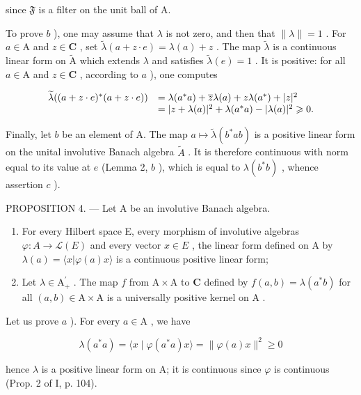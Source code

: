 since \(\mathfrak{F}\) is a filter on the unit ball of A.

To prove \(b\) ), one may assume that \(\lambda\) is not zero, and then that \(\| \lambda \| = 1\) . For \(a \in \mathrm{A}\) and \(z \in \mathbf{C}\) , set \(\widetilde{\lambda}(a + z \cdot e) = \lambda(a) + z\) . The map \(\widetilde{\lambda}\) is a continuous linear form on \(\widetilde{\mathrm{A}}\) which extends \(\lambda\) and satisfies \(\widetilde{\lambda}(e) = 1\) . It is positive: for all \(a \in \mathrm{A}\) and \(z \in \mathbf{C}\) , according to \(a\) ), one computes

\[
\begin{array}{r l} \widetilde {\lambda} ((a + z \cdot e) ^ {*} (a + z \cdot e)) & = \lambda (a ^ {*} a) + \overline {{z}} \lambda (a) + z \lambda (a ^ {*}) + | z | ^ {2} \\ & = | z + \lambda (a) | ^ {2} + \lambda (a ^ {*} a) - | \lambda (a) | ^ {2} \geqslant 0. \end{array}
\]

Finally, let \(b\) be an element of A. The map \(a \mapsto \widetilde{\lambda}(b^{*}ab)\) is a positive linear form on the unital involutive Banach algebra \(\widetilde{A}\) . It is therefore continuous with norm equal to its value at \(e\) (Lemma 2, \(b\) ), which is equal to \(\lambda(b^{*}b)\) , whence assertion \(c\) ).

PROPOSITION 4. — Let A be an involutive Banach algebra.

\begin{enumerate}
\def\labelenumi{\alph{enumi})}
\item
  For every Hilbert space E, every morphism of involutive algebras \(\varphi\colon A\to\mathcal{L}(E)\) and every vector \(x\in E\) , the linear form defined on A by \(\lambda(a)=\langle x|\varphi(a)x\rangle\) is a continuous positive linear form;
\item
  Let \(\lambda \in \mathrm{A}_{+}^{\prime}\) . The map \(f\) from \(\mathrm{A} \times \mathrm{A}\) to \(\mathbf{C}\) defined by \(f(a, b) = \lambda (a^{*}b)\) for all \((a, b) \in \mathrm{A} \times \mathrm{A}\) is a universally positive kernel on \(\mathrm{A}\) .
\end{enumerate}

Let us prove \(a\) ). For every \(a \in \mathrm{A}\) , we have

\[
\lambda (a ^ {*} a) = \langle x \mid \varphi (a ^ {*} a) x \rangle = \| \varphi (a) x \| ^ {2} \geqslant 0
\]

hence \(\lambda\) is a positive linear form on A; it is continuous since \(\varphi\) is continuous (Prop. 2 of I, p. 104).

